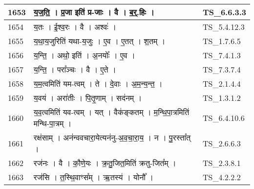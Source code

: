 \documentclass[17pt]{extarticle}
\begin{document}
\begin{longtable}{||p{0.4in}||p{4.9in}||p{0.9in}||}
    \hline
        
    1653 & य॒ज॒ति॒   ।   प्र॒जा इति॑ प्र{-}जाः   ।   वै   ।   ब॒र्॒.हिः   ।    & TS\_6.6.3.3       \\
    
    \hline
        
    1654 & य॒तः   ।   ई॒श्व॒रः   ।   वै   ।   अश्वः॑   ।    & TS\_5.4.12.3       \\
    
    \hline
        
    1655 & य॒था॒य॒जुरिति॑ यथा{-}य॒जुः   ।   ए॒व   ।   ए॒तत्   ।   श॒तम्   ।    & TS\_1.7.6.5       \\
    
    \hline
        
    1656 & य॒न्ति॒   ।   अथो॒ इति॑   ।   अ॒नयोः᳚   ।   ए॒व   ।    & TS\_7.4.1.3       \\
    
    \hline
        
    1657 & य॒न्ति॒   ।   परा᳚ञ्चः   ।   वै   ।   ए॒ते   ।    & TS\_7.3.7.4       \\
    
    \hline
        
    1658 & य॒म॒त्वमिति॑ यम{-}त्वम्   ।   ते   ।   दे॒वाः   ।   अ॒म॒न्य॒न्त॒   ।    & TS\_2.1.4.4       \\
    
    \hline
        
    1659 & य॒वय॑   ।   अरा॑तीः   ।   पि॒तृ॒णाम्   ।   सद॑नम्   ।    & TS\_1.3.1.2       \\
    
    \hline
        
    1660 & य॒व॒त्वमिति॑ यव{-}त्वम्   ।   यत्   ।   वैक॑ङ्कतम्   ।   म॒न्थि॒पा॒त्रमिति॑ मन्थि{-}पा॒त्रम्   ।    & TS\_6.4.10.6       \\
    
    \hline
        
    1661 & रक्ष॑साम्   ।   अन॑न्ववचारा॒येत्यन॑नु{-}अ॒व॒चा॒रा॒य॒   ।   न   ।   पु॒रस्ता᳚त्   ।    & TS\_2.6.6.3       \\
    
    \hline
        
    1662 & रज॑नः   ।   वै   ।   कौ॒णे॒यः   ।   क्र॒तु॒जित॒मिति॑ क्रतु{-}जित᳚म्   ।    & TS\_2.3.8.1       \\
    
    \hline
        
    1663 & रज॑सि   ।   त॒स्थि॒वाꣳस᳚म्   ।   ऋ॒तस्य॑   ।   योनौ᳚   ।    & TS\_4.2.2.2       \\
    

\end{longtable}
\end{document}

